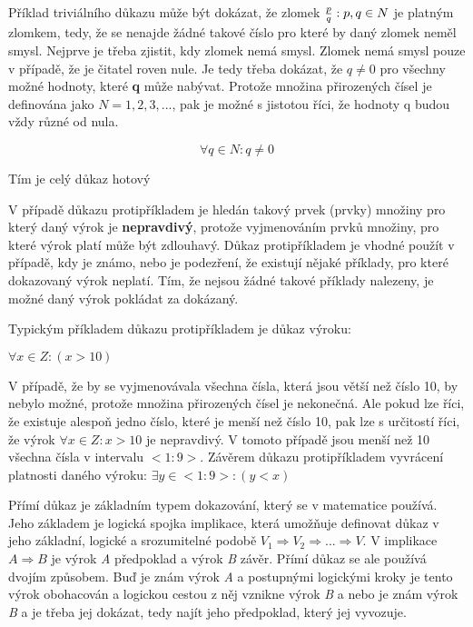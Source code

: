 Příklad triviálního důkazu může být dokázat, že zlomek ${p \over q}: p,q \in N$ je platným zlomkem, tedy, že se nenajde žádné takové číslo pro které by daný zlomek neměl smysl. Nejprve je třeba zjistit, kdy zlomek nemá smysl. Zlomek nemá smysl pouze v případě, že je čitatel roven nule. Je tedy třeba dokázat, že $q \neq 0$ pro všechny možné hodnoty, které {\bf q} může nabývat. Protože množina přirozených čísel je definována jako $N = {1, 2, 3, ...}$, pak je možné s jistotou říci, že hodnoty {q} budou vždy různé od nula.

$$\forall q\in N : q \neq 0$$

Tím je celý důkaz hotový


V případě důkazu protipříkladem je hledán takový prvek (prvky) množiny pro který daný výrok je {\bf nepravdivý}, protože vyjmenováním prvků množiny, pro které výrok platí může být zdlouhavý. Důkaz protipříkladem je vhodné použít v případě, kdy je známo, nebo je podezření, že existují nějaké příklady, pro které dokazovaný výrok neplatí. Tím, že nejsou žádné takové příklady nalezeny, je možné daný výrok pokládat za dokázaný. 

Typickým příkladem důkazu protipříkladem je důkaz výroku:\par\noindent $\forall x \in Z: (x>10)$ 

V případě, že by se vyjmenovávala všechna čísla, která jsou větší než číslo 10, by nebylo možné, protože množina přirozených čísel je nekonečná. Ale pokud lze říci, že existuje alespoň jedno číslo, které je menší než číslo 10, pak lze s určitostí říci, že výrok  $\forall x \in Z: x>10$  je nepravdivý. V tomoto případě jsou menší než 10 všechna čísla v intervalu $<1:9>$. Závěrem důkazu protipříkladem vyvrácení platnosti daného výroku: $\exists y \in <1:9> : (y<x)$ 



Přímí důkaz je základním typem dokazování, který se v matematice používá. Jeho základem je logická spojka implikace, která umožňuje definovat důkaz v jeho základní, logické a srozumitelné podobě $V_1 \Rightarrow V_2 \Rightarrow ... \Rightarrow V$. V implikace $A \Rightarrow B$ je výrok {\it A} předpoklad a výrok {\it B} závěr. Přímí důkaz se ale používá dvojím způsobem. Buď je znám výrok {\it A} a postupnými logickými kroky je tento výrok obohacován a logickou cestou z něj vznikne výrok {\it B} a nebo je znám výrok {\it B} a je třeba jej dokázat, tedy najít jeho předpoklad, který jej vyvozuje.

